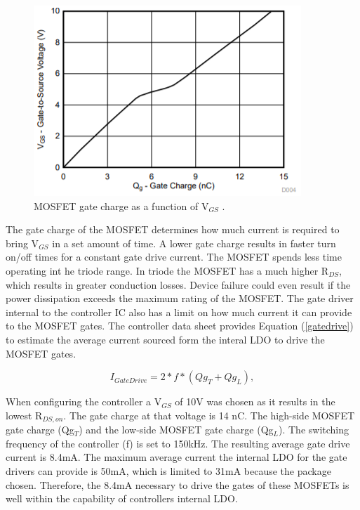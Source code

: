 \documentclass[11pt]{article}
\begin{document}
    \begin{figure}[H]
            \centering
            \includegraphics[width=0.5\linewidth]{mosfetgatecharge.PNG}
            \caption{MOSFET gate charge as a function of V$_{GS}$ \cite{shen_yaur_chen_block_2016}.}
            \label{mosfetgate}
    \end{figure}
    
    The gate charge of the MOSFET determines how much current is required to bring V$_{GS}$ in a set amount of time. A lower gate charge results in faster turn on/off times for a constant gate drive current. The MOSFET spends less time operating int he triode range. In triode the MOSFET has a much higher R$_{DS}$, which results in greater conduction losses. Device failure could even result if the power dissipation exceeds the maximum rating of the MOSFET.
    \newline
    \newline
    \noindent The gate driver internal to the controller IC also has a limit on how much current it can provide to the MOSFET gates. The controller data sheet provides Equation (\ref{gatedrive}) to estimate the average current sourced form the interal LDO to drive the MOSFET gates. 
    
    \begin{equation}
        I_{GateDrive}=2*f*(Qg_T+Qg_L),
        \label{gatedrive}
    \end{equation}
    
    \noindent When configuring the controller a V$_{GS}$ of 10V was chosen as it results in the lowest R$_{DS,on}$. The gate charge at that voltage is 14 nC. The high-side MOSFET gate charge (Qg$_T$) and the low-side MOSFET gate charge (Qg$_L$). The switching frequency of the controller (f) is set to 150kHz. The resulting average gate drive current is 8.4mA. The maximum average current the internal LDO for the gate drivers can provide is 50mA, which is limited to 31mA because the package chosen. Therefore, the 8.4mA necessary to drive the gates of these MOSFETs is well within the capability of controllers internal LDO.
    
\end{document}

